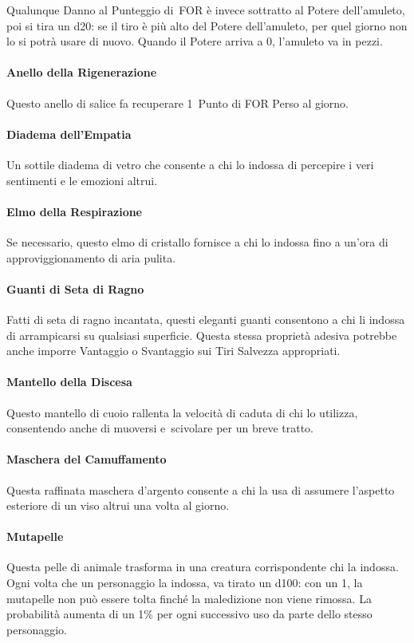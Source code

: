 \documentclass[itdr]{subfiles}
\begin{document}
Qualunque Danno al Punteggio di~FOR è invece sottratto al Potere dell'amuleto, poi si tira un d20: se il tiro è più alto del Potere dell'amuleto, per quel giorno non lo si potrà usare di nuovo. Quando il Potere arriva a 0, l'amuleto va in pezzi.

\vfill
\paragraph{Anello della Rigenerazione}
Questo anello di salice fa recuperare 1~Punto di FOR Perso al giorno.

\vfill
\paragraph{Diadema dell'Empatia}
Un sottile diadema di vetro che consente a chi lo indossa di percepire i veri sentimenti e le emozioni altrui.

\vfill
\paragraph{Elmo della Respirazione}
Se necessario, questo elmo di cristallo fornisce a chi lo indossa fino a un'ora di approviggionamento di aria pulita.

\vfill
\paragraph{Guanti di Seta di Ragno}
Fatti di seta di ragno incantata, questi eleganti guanti consentono a chi li indossa di arrampicarsi su qualsiasi superficie. Questa stessa proprietà adesiva potrebbe anche imporre Vantaggio o Svantaggio sui Tiri Salvezza appropriati.

\vfill
\paragraph{Mantello della Discesa}
Questo mantello di cuoio rallenta la velocità di caduta di chi lo utilizza, consentendo anche di muoversi e~scivolare per un breve tratto.

\vfill
\paragraph{Maschera del Camuffamento}
Questa raffinata maschera d'argento consente a chi la usa di assumere l'aspetto esteriore di un \mbox{viso} altrui una volta al giorno.

\vfill
\paragraph{Mutapelle}
Questa pelle di animale trasforma in una creatura corrispondente chi la indossa. Ogni volta che un personaggio la indossa, va tirato un d100: con un 1, la mutapelle non può essere tolta finché la maledizione non viene rimossa. La probabilità aumenta di un 1\% per ogni successivo uso da parte dello stesso personaggio.
\end{document}
